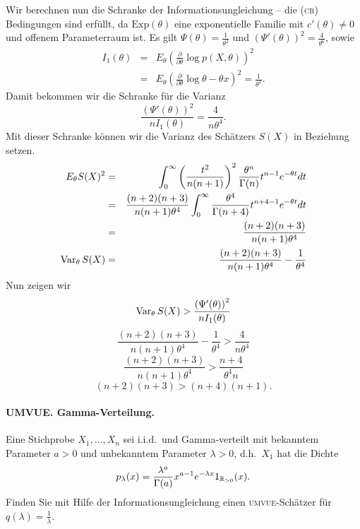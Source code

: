 Wir berechnen nun die Schranke der Informationsungleichung -- die \textsc{(cr)} Bedingungen
sind erfüllt, da $\textrm{Exp}(\theta)$ eine exponentielle Familie mit $c'(\theta)\neq 0$ und 
offenem Parameterraum ist. Es gilt $\Psi(\theta)=\frac{1}{\theta^2}$ und 
$\left( \Psi'(\theta) \right)^2= \frac{4}{\theta^6}$, sowie
\begin{eqnarray}
    I_1(\theta) &=& E_\theta \left( \frac{\partial}{\partial \theta} \log p(X, \theta) \right)^2 \\
    &=& E_\theta \left( \frac{\partial}{\partial \theta} \log \theta -\theta x \right)^2 = \frac{1}{\theta^2}.
\end{eqnarray}
Damit bekommen wir die Schranke für die Varianz
\begin{equation}
    \frac{\left( \Psi'(\theta) \right)^2}{n I_1(\theta) } = \frac{4}{n \theta^4}.
\end{equation}
Mit dieser Schranke können wir die Varianz des Schätzers $S(X)$ in Beziehung setzen.
\begin{eqnarray}
    E_\theta S(X)^2 &=& \int_{0}^{\infty} \left( \frac{t^2}{n(n+1)} \right)^2 \frac{\theta^n}{\Gamma(n)} t^{n-1} e^{-\theta t} dt \\
    &=& \frac{(n+2)(n+3)}{n(n+1)\theta^4} \int_{0}^{\infty} \frac{\theta^4}{\Gamma(n+4)}t^{n+4-1} e^{-\theta t} dt \\
    &=&  \frac{(n+2)(n+3)}{n(n+1)\theta^4} \\
    \operatorname{Var}_\theta S(X) &=& \frac{(n+2)(n+3)}{n(n+1)\theta^4} - \frac{1}{\theta^4}
\end{eqnarray}
Nun zeigen wir
\begin{equation}
    \operatorname{Var}_\theta S(X) > \frac{\left( \Psi'(\theta) \right)^2}{n I_1(\theta) }
\end{equation}
\begin{equation}
    \frac{(n+2)(n+3)}{n(n+1)\theta^4} - \frac{1}{\theta^4} > \frac{4}{n \theta^4}
\end{equation}
\begin{equation}
    \frac{(n+2)(n+3)}{n(n+1)\theta^4} > \frac{n+4}{\theta^4 n}
\end{equation}
\begin{equation}
    (n+2)(n+3) > (n+4)(n+1).
\end{equation}







\paragraph{UMVUE. Gamma-Verteilung. } Eine Stichprobe $X_1, \ldots, X_n$ sei i.i.d.\
und Gamma-verteilt mit bekanntem Parameter $a>0$ und unbekanntem Parameter 
$\lambda>0$, d.h.\ $X_1$ hat die Dichte
\begin{equation}
    p_\lambda (x) = \frac{\lambda^a}{\Gamma(a)} x^{a-1}e^{-\lambda x} 1_{\mathbb R_{>0}}(x).
\end{equation}
Finden Sie mit Hilfe der Informationsungleichung einen \textsc{umvue}-Schätzer für
$q(\lambda) = \frac{1}{\lambda}$.

